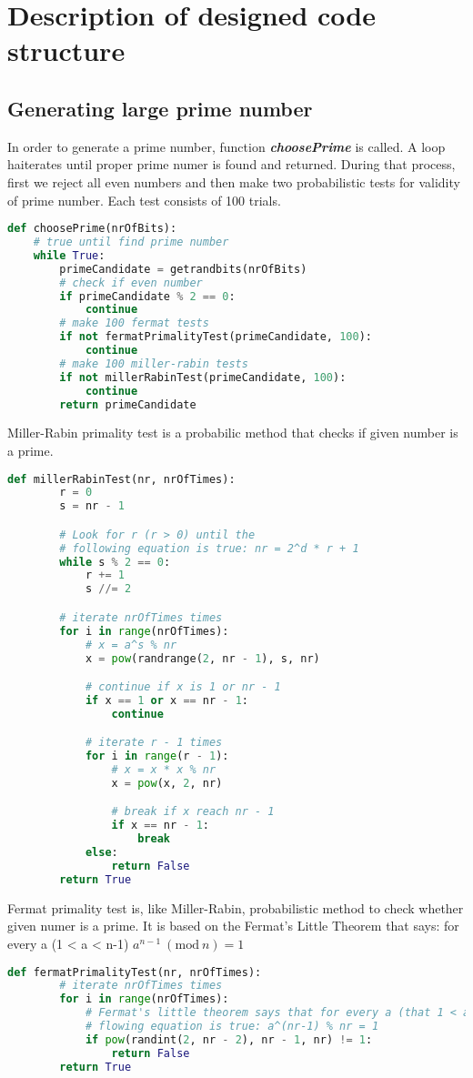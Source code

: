 \documentclass[a4paper,12pt]{article}
\newcommand{\Mod}[1]{\ (\mathrm{mod}\ #1)}
\begin{document}
\section{Description of designed code structure}
\subsection{Generating large prime number}
In order to generate a prime number, function \textbf{\textit{choosePrime}} is called. A loop haiterates until proper prime numer is found and returned. 
During that process, first we reject all even numbers and then make two probabilistic tests for validity of prime number. Each test consists of 100 trials.
\begin{lstlisting}[language=Python]
  def choosePrime(nrOfBits):
    # true until find prime number
    while True:
        primeCandidate = getrandbits(nrOfBits)
        # check if even number
        if primeCandidate % 2 == 0:
            continue
        # make 100 fermat tests 
        if not fermatPrimalityTest(primeCandidate, 100):
            continue
        # make 100 miller-rabin tests
        if not millerRabinTest(primeCandidate, 100):
            continue
        return primeCandidate
\end{lstlisting}
Miller-Rabin primality test is a probabilic method that checks if given number is a prime.
\begin{lstlisting}[language=Python]
    def millerRabinTest(nr, nrOfTimes):
        r = 0 
        s = nr - 1

        # Look for r (r > 0) until the
        # following equation is true: nr = 2^d * r + 1
        while s % 2 == 0:
            r += 1
            s //= 2

        # iterate nrOfTimes times
        for i in range(nrOfTimes):
            # x = a^s % nr
            x = pow(randrange(2, nr - 1), s, nr)

            # continue if x is 1 or nr - 1
            if x == 1 or x == nr - 1:
                continue

            # iterate r - 1 times
            for i in range(r - 1):
                # x = x * x % nr
                x = pow(x, 2, nr)

                # break if x reach nr - 1
                if x == nr - 1:
                    break
            else:
                return False
        return True
\end{lstlisting}
\newpage
Fermat primality test is, like Miller-Rabin, probabilistic method to check whether given numer is a prime. It is based on the Fermat's Little Theorem that says: for every a (1 < a < n-1) $ a^{n-1} \Mod n = 1 $
\begin{lstlisting}[language=Python]
    def fermatPrimalityTest(nr, nrOfTimes):
        # iterate nrOfTimes times
        for i in range(nrOfTimes):
            # Fermat's little theorem says that for every a (that 1 < a < nr-1)
            # flowing equation is true: a^(nr-1) % nr = 1
            if pow(randint(2, nr - 2), nr - 1, nr) != 1:
                return False
        return True
\end{lstlisting}
\end{document}
